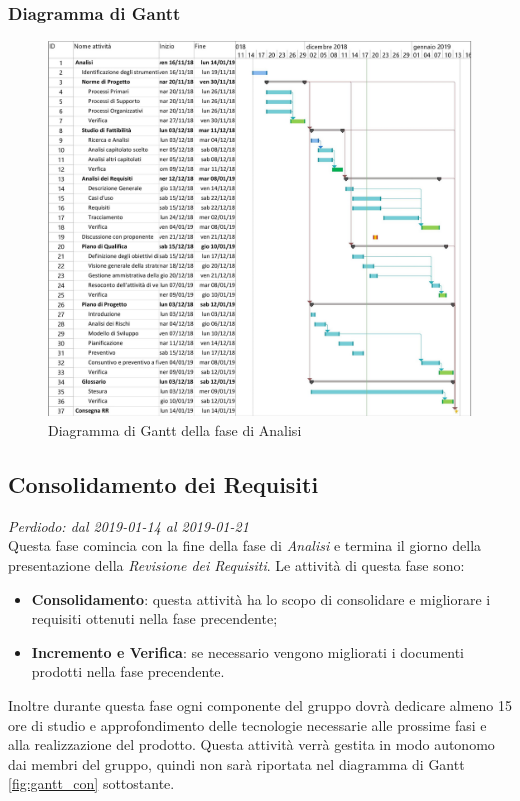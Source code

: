 \subsubsection{Diagramma di Gantt}
\begin{figure}[H]
	\includegraphics[scale=0.8]{res/images/gantt_analisi.jpg}
	\caption{Diagramma di Gantt della fase di Analisi}
\end{figure}



\subsection{Consolidamento dei Requisiti}
\textit{Perdiodo: dal 2019-01-14 al 2019-01-21} \\
Questa fase comincia con la fine della fase di \textit{Analisi} e termina il giorno della presentazione della \textit{Revisione dei Requisiti}. Le attività di questa fase sono:
\begin{itemize}
	\item \textbf{Consolidamento}: questa attività ha lo scopo di consolidare e migliorare i requisiti ottenuti nella fase precendente;
	\item \textbf{Incremento e Verifica}: se necessario vengono migliorati i documenti prodotti nella fase precendente.
\end{itemize}
Inoltre durante questa fase ogni componente del gruppo dovrà dedicare almeno 15 
ore di studio e approfondimento delle tecnologie necessarie alle prossime fasi 
e alla realizzazione del prodotto. Questa attività verrà gestita in modo 
autonomo dai membri del gruppo, quindi non sarà riportata nel diagramma di 
Gantt \ref{fig:gantt_con} sottostante.

